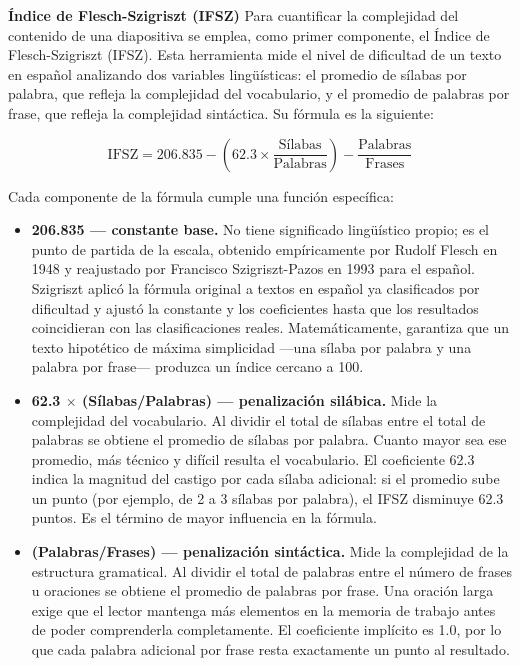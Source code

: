 \documentclass[11pt]{article}
\begin{document}
\textbf{Índice de Flesch-Szigriszt (IFSZ)}
Para cuantificar la complejidad del contenido de una diapositiva se emplea, como primer componente, el Índice de Flesch-Szigriszt (IFSZ). Esta herramienta mide el nivel de dificultad de un texto en español analizando dos variables lingüísticas: el promedio de sílabas por palabra, que refleja la complejidad del vocabulario, y el promedio de palabras por frase, que refleja la complejidad sintáctica. Su fórmula es la siguiente:

\[
\mathrm{IFSZ} = 206.835 - (62.3 \times \frac{\text{Sílabas}}{\text{Palabras}}) - \frac{\text{Palabras}}{\text{Frases}}
\]

Cada componente de la fórmula cumple una función específica:
\begin{itemize}
    \item \textbf{206.835 — constante base.} No tiene significado lingüístico propio; es el punto de partida de la escala, obtenido empíricamente por Rudolf Flesch en 1948 y reajustado por Francisco Szigriszt-Pazos en 1993 para el español. Szigriszt aplicó la fórmula original a textos en español ya clasificados por dificultad y ajustó la constante y los coeficientes hasta que los resultados coincidieran con las clasificaciones reales. Matemáticamente, garantiza que un texto hipotético de máxima simplicidad —una sílaba por palabra y una palabra por frase— produzca un índice cercano a 100.
    \item \textbf{62.3 $\times$ (Sílabas/Palabras) — penalización silábica.} Mide la complejidad del vocabulario. Al dividir el total de sílabas entre el total de palabras se obtiene el promedio de sílabas por palabra. Cuanto mayor sea ese promedio, más técnico y difícil resulta el vocabulario. El coeficiente 62.3 indica la magnitud del castigo por cada sílaba adicional: si el promedio sube un punto (por ejemplo, de 2 a 3 sílabas por palabra), el IFSZ disminuye 62.3 puntos. Es el término de mayor influencia en la fórmula.
    \item \textbf{(Palabras/Frases) — penalización sintáctica.} Mide la complejidad de la estructura gramatical. Al dividir el total de palabras entre el número de frases u oraciones se obtiene el promedio de palabras por frase. Una oración larga exige que el lector mantenga más elementos en la memoria de trabajo antes de poder comprenderla completamente. El coeficiente implícito es 1.0, por lo que cada palabra adicional por frase resta exactamente un punto al resultado.
\end{itemize}
\end{document}
